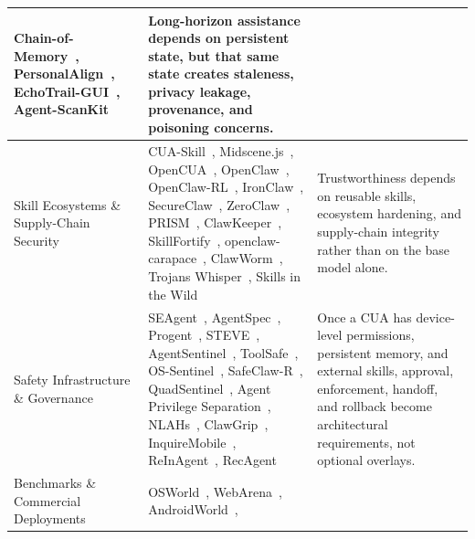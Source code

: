 \begin{table}[!ht]
\begin{tabularx}{\textwidth}{@{}L{2.5cm} X L{3.8cm}@{}}
Chain-of-Memory~\cite{chainofmemory2025},
PersonalAlign~\cite{personalalign2026},
EchoTrail-GUI~\cite{echotrailgui2025},
Agent-ScanKit~\cite{agentscankit2025} &
Long-horizon assistance depends on persistent state, but that same state creates staleness, privacy leakage, provenance, and poisoning concerns. \\
\midrule
Skill Ecosystems \& Supply-Chain Security &
CUA-Skill~\cite{cuaskill2026},
Midscene.js~\cite{midscene2025},
OpenCUA~\cite{opencua2025},
OpenClaw~\cite{openclaw2026},
OpenClaw-RL~\cite{openclawrl2026},
\colorbox{evSaf!15}{IronClaw~\cite{ironclaw2026}},
\colorbox{evSaf!15}{SecureClaw~\cite{secureclaw2026}},
\colorbox{evSaf!15}{ZeroClaw~\cite{zeroclaw2026}},
\colorbox{evSaf!15}{PRISM~\cite{openclawprism2026}},
\colorbox{evSaf!15}{ClawKeeper~\cite{clawkeeper2026}},
\colorbox{evSaf!15}{SkillFortify~\cite{skillfortify2026}},
\colorbox{evSaf!15}{openclaw-carapace~\cite{openclawcarapace2026}},
\colorbox{evSaf!15}{ClawWorm~\cite{clawworm2026}},
\colorbox{evSaf!15}{Trojans Whisper~\cite{trojanswhisper2026}},
\colorbox{evSaf!15}{Skills in the Wild~\cite{agentskillswild2026}} &
Trustworthiness depends on reusable skills, ecosystem hardening, and supply-chain integrity rather than on the base model alone. \\
\midrule
Safety Infrastructure \& Governance &
\colorbox{evSaf!15}{SEAgent~\cite{seagent2026}},
\colorbox{evSaf!15}{AgentSpec~\cite{agentspec2025}},
\colorbox{evSaf!15}{Progent~\cite{progent2025}},
\colorbox{evSaf!15}{STEVE~\cite{steve2025}},
\colorbox{evSaf!15}{AgentSentinel~\cite{agentsentinel2025}},
\colorbox{evSaf!15}{ToolSafe~\cite{toolsafe2026}},
\colorbox{evSaf!15}{OS-Sentinel~\cite{ossentinel2025}},
\colorbox{evSaf!15}{SafeClaw-R~\cite{safeclawr2026}},
\colorbox{evSaf!15}{QuadSentinel~\cite{quadsentinel2025}},
\colorbox{evSaf!15}{Agent Privilege Separation~\cite{agentprivsep2026}},
\colorbox{evSaf!15}{NLAHs~\cite{nlah2026}},
\colorbox{evSaf!15}{ClawGrip~\cite{shan2026dontletclawgrip}},
\colorbox{evSaf!15}{InquireMobile~\cite{inquiremobile2025}},
\colorbox{evSaf!15}{ReInAgent~\cite{reinagent2025}},
\colorbox{evSaf!15}{RecAgent~\cite{recagent2025}} &
Once a CUA has device-level permissions, persistent memory, and external skills, approval, enforcement, handoff, and rollback become architectural requirements, not optional overlays. \\
\midrule
Benchmarks \& Commercial Deployments &
OSWorld~\cite{osworld2024},
WebArena~\cite{webarena2023},
AndroidWorld~\cite{androidworld2024},

\end{tabularx}
\end{table}
